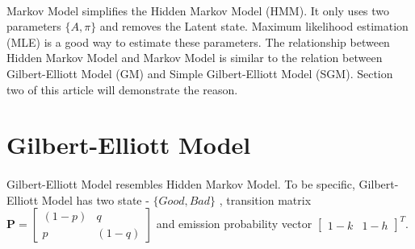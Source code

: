 \documentclass[11pt]{article}
\begin{document}
    \paragraph{}
    Markov Model simplifies the Hidden Markov Model (HMM). It only uses two parameters $\{A,\pi\}$ and removes the Latent state. Maximum likelihood estimation (MLE) is a good way to 
    estimate these parameters. The relationship between Hidden Markov Model and Markov Model is similar to the relation between Gilbert-Elliott Model (GM) and Simple Gilbert-Elliott Model (SGM). Section two of this article will demonstrate the reason. 
    \section{Gilbert-Elliott Model}
    \paragraph{}Gilbert-Elliott Model resembles Hidden Markov Model. To be specific, Gilbert-Elliott Model has two state - $\{Good, Bad\}$ , transition matrix $\boldsymbol{P}=\left[\begin{array}{cc}(1-p) & q \\ p & (1-q)\end{array}\right]$ and emission probability vector $\left[\begin{array}{cc}1-k&1-h\end{array}\right]^T$.
\end{document}
